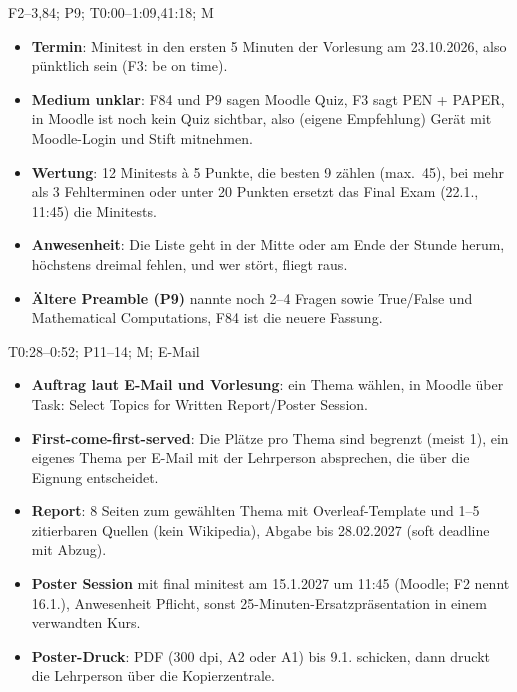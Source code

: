 \documentclass[10pt,a4paper]{article}
\newcommand{\block}[2]{\par\vspace{3pt}{\bfseries #1}\hfill{\scriptsize #2}\par\nopagebreak}
\begin{document}
\block{Logistik am Freitag}{F2--3,84; P9; T0:00--1:09,41:18; M}
\begin{itemize}
\item \textbf{Termin}: Minitest in den ersten 5 Minuten der Vorlesung am 23.10.2026, also pünktlich sein (F3: \glqq be on time\grqq).
\item \textbf{Medium unklar}: F84 und P9 sagen Moodle Quiz, F3 sagt PEN + PAPER, in Moodle ist noch kein Quiz sichtbar, also (eigene Empfehlung) Gerät mit Moodle-Login und Stift mitnehmen.
\item \textbf{Wertung}: 12 Minitests à 5 Punkte, die besten 9 zählen (max.\ 45), bei mehr als 3 Fehlterminen oder unter 20 Punkten ersetzt das Final Exam (22.1., 11:45) die Minitests.
\item \textbf{Anwesenheit}: Die Liste geht in der Mitte oder am Ende der Stunde herum, höchstens dreimal fehlen, und wer stört, fliegt raus.
\item \textbf{Ältere Preamble (P9)} nannte noch 2--4 Fragen sowie True/False und Mathematical Computations, F84 ist die neuere Fassung.
\end{itemize}
\block{Poster-Thema wählen}{T0:28--0:52; P11--14; M; E-Mail}
\begin{itemize}
\item \textbf{Auftrag laut E-Mail und Vorlesung}: ein Thema wählen, in Moodle über \glqq Task: Select Topics for Written Report/Poster Session\grqq.
\item \textbf{First-come-first-served}: Die Plätze pro Thema sind begrenzt (meist 1), ein eigenes Thema per E-Mail mit der Lehrperson absprechen, die über die Eignung entscheidet.
\item \textbf{Report}: 8 Seiten zum gewählten Thema mit Overleaf-Template und 1--5 zitierbaren Quellen (kein Wikipedia), Abgabe bis 28.02.2027 (soft deadline mit Abzug).
\item \textbf{Poster Session} mit final minitest am 15.1.2027 um 11:45 (Moodle; F2 nennt 16.1.), Anwesenheit Pflicht, sonst 25-Minuten-Ersatzpräsentation in einem verwandten Kurs.
\item \textbf{Poster-Druck}: PDF (300 dpi, A2 oder A1) bis 9.1. schicken, dann druckt die Lehrperson über die Kopierzentrale.
\end{itemize}
\end{document}
